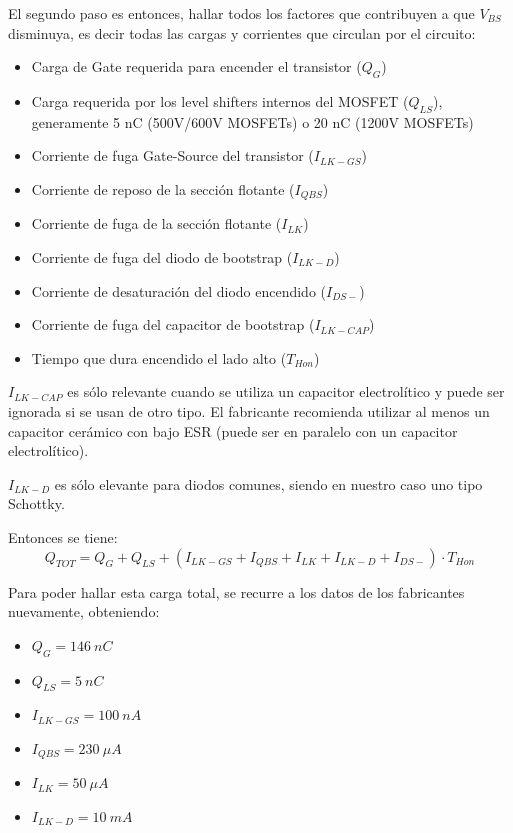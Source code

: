 \documentclass[titlepage, 12pt]{article}
\begin{document}
El segundo paso es entonces, hallar todos los factores que contribuyen a que $V_{BS}$ disminuya, es decir todas las cargas y corrientes que circulan por el circuito:
    \begin{itemize}
        \item Carga de Gate requerida para encender el transistor ($Q_G$)
        \item Carga requerida por los level shifters internos del MOSFET ($Q_{LS}$), generamente 5 nC (500V/600V MOSFETs) o 20 nC (1200V MOSFETs)
        \item Corriente de fuga Gate-Source del transistor ($I_{LK-GS}$)
        \item Corriente de reposo de la sección flotante ($I_{QBS}$)
        \item Corriente de fuga de la sección flotante ($I_{LK}$)
        \item Corriente de fuga del diodo de bootstrap ($I_{LK-D}$)
        \item Corriente de desaturación del diodo encendido ($I_{DS-}$)
        \item Corriente de fuga del capacitor de bootstrap ($I_{LK-CAP}$)
        \item Tiempo que dura encendido el lado alto ($T_{Hon}$)
    \end{itemize}
$I_{LK-CAP}$ es sólo relevante cuando se utiliza un capacitor electrolítico y puede ser ignorada si se usan de otro tipo. El fabricante recomienda utilizar al menos un capacitor cerámico con bajo ESR (puede ser en paralelo con un capacitor electrolítico).

$I_{LK-D}$ es sólo elevante para diodos comunes, siendo en nuestro caso uno tipo Schottky.

Entonces se tiene:
    \begin{equation}
        \label{eq:bootstrap-qtot}
        Q_{TOT} = Q_G + Q_{LS} + (I_{LK-GS} + I_{QBS} + I_{LK} + I_{LK-D} + I_{DS-}) \cdot T_{Hon}
    \end{equation}

Para poder hallar esta carga total, se recurre a los datos de los fabricantes nuevamente, obteniendo:
    \begin{itemize}
        \item $Q_G = \SI{146}{nC}$
        \item $Q_{LS} = \SI{5}{nC}$
        \item $I_{LK-GS} = \SI{100}{nA}$
        \item $I_{QBS} = \SI{230}{\mu A}$
        \item $I_{LK} = \SI{50}{\mu A}$
        \item $I_{LK-D} = \SI{10}{mA}$
    \end{itemize}
\end{document}
